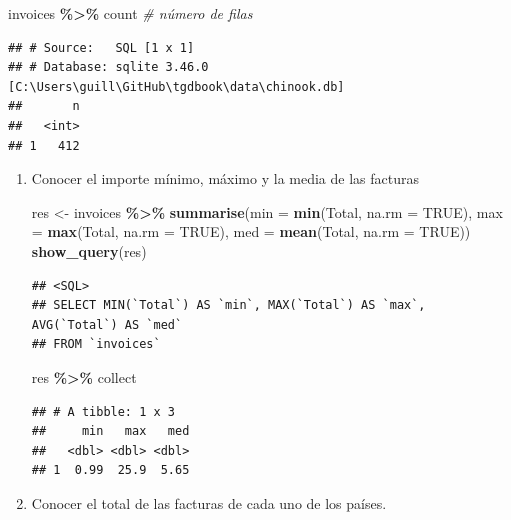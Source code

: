 \documentclass[
]{book}
\newenvironment{Shaded}{\begin{snugshade}}{\end{snugshade}}
\newcommand{\AttributeTok}[1]{\textcolor[rgb]{0.13,0.29,0.53}{#1}}
\newcommand{\CommentTok}[1]{\textcolor[rgb]{0.56,0.35,0.01}{\textit{#1}}}
\newcommand{\ConstantTok}[1]{\textcolor[rgb]{0.56,0.35,0.01}{#1}}
\newcommand{\FunctionTok}[1]{\textcolor[rgb]{0.13,0.29,0.53}{\textbf{#1}}}
\newcommand{\NormalTok}[1]{#1}
\newcommand{\OtherTok}[1]{\textcolor[rgb]{0.56,0.35,0.01}{#1}}
\newcommand{\SpecialCharTok}[1]{\textcolor[rgb]{0.81,0.36,0.00}{\textbf{#1}}}
\begin{document}
\begin{Shaded}
\begin{Highlighting}[]
\NormalTok{invoices }\SpecialCharTok{\%\textgreater{}\%}\NormalTok{ count }\CommentTok{\# número de filas}
\end{Highlighting}
\end{Shaded}

\begin{verbatim}
## # Source:   SQL [1 x 1]
## # Database: sqlite 3.46.0 [C:\Users\guill\GitHub\tgdbook\data\chinook.db]
##       n
##   <int>
## 1   412
\end{verbatim}

\begin{enumerate}
\def\labelenumi{\arabic{enumi}.}
\item
  Conocer el importe mínimo, máximo y la media de las facturas

\begin{Shaded}
\begin{Highlighting}[]
\NormalTok{res }\OtherTok{\textless{}{-}}\NormalTok{ invoices }\SpecialCharTok{\%\textgreater{}\%} \FunctionTok{summarise}\NormalTok{(}\AttributeTok{min =} \FunctionTok{min}\NormalTok{(Total, }\AttributeTok{na.rm =} \ConstantTok{TRUE}\NormalTok{), }
                        \AttributeTok{max =} \FunctionTok{max}\NormalTok{(Total, }\AttributeTok{na.rm =} \ConstantTok{TRUE}\NormalTok{), }\AttributeTok{med =} \FunctionTok{mean}\NormalTok{(Total, }\AttributeTok{na.rm =} \ConstantTok{TRUE}\NormalTok{))}
\FunctionTok{show\_query}\NormalTok{(res)}
\end{Highlighting}
\end{Shaded}

\begin{verbatim}
## <SQL>
## SELECT MIN(`Total`) AS `min`, MAX(`Total`) AS `max`, AVG(`Total`) AS `med`
## FROM `invoices`
\end{verbatim}

\begin{Shaded}
\begin{Highlighting}[]
\NormalTok{res  }\SpecialCharTok{\%\textgreater{}\%}\NormalTok{ collect}
\end{Highlighting}
\end{Shaded}

\begin{verbatim}
## # A tibble: 1 x 3
##     min   max   med
##   <dbl> <dbl> <dbl>
## 1  0.99  25.9  5.65
\end{verbatim}
\item
  Conocer el total de las facturas de cada uno de los países.


\end{enumerate}
\end{document}
